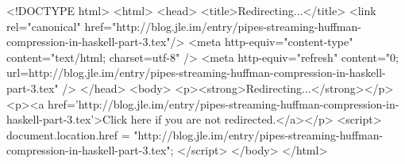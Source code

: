 <!DOCTYPE html>
<html>
<head>
<title>Redirecting...</title>
<link rel="canonical" href="http://blog.jle.im/entry/pipes-streaming-huffman-compression-in-haskell-part-3.tex"/>
<meta http-equiv="content-type" content="text/html; charset=utf-8" />
<meta http-equiv="refresh" content="0; url=http://blog.jle.im/entry/pipes-streaming-huffman-compression-in-haskell-part-3.tex" />
</head>
<body>
  <p><strong>Redirecting...</strong></p>
  <p><a href='http://blog.jle.im/entry/pipes-streaming-huffman-compression-in-haskell-part-3.tex'>Click here if you are not redirected.</a></p>
  <script>
    document.location.href = "http://blog.jle.im/entry/pipes-streaming-huffman-compression-in-haskell-part-3.tex";
  </script>
</body>
</html>
